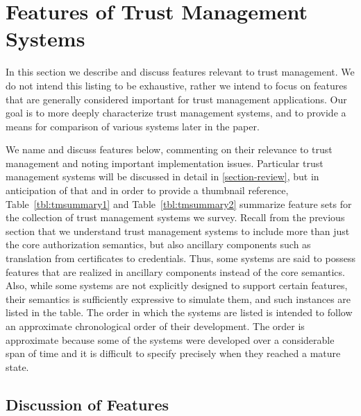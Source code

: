 \section{Features of Trust Management Systems}
\label{section-features}

In this section we describe and discuss features relevant to trust
management.  We do not intend this listing to be exhaustive, rather we
intend to focus on features that are generally considered important
for trust management applications.  Our goal is to more deeply
characterize trust management systems, and to provide a means for
comparison of various systems later in the paper.

We name and discuss features below, commenting on their relevance to trust
management and noting important implementation issues. Particular trust
management systems will be discussed in detail in \autoref{section-review},
but in anticipation of that and in order to provide a thumbnail reference,
Table~\ref{tbl:tmsummary1} and Table~\ref{tbl:tmsummary2} summarize feature
sets for the collection of trust management systems we survey. Recall from
the previous section that we understand trust management systems to
include more than just the core authorization semantics, but also ancillary
components such as translation from certificates to credentials. Thus, some
systems are said to possess features that are realized in ancillary
components instead of the core semantics. Also, while some systems are
not explicitly designed to support certain features, their semantics is
sufficiently expressive to simulate them, and such instances are listed in
the table. The order in which the systems are listed is
intended to follow an approximate chronological order of their development.
The order is approximate because some of the systems were developed over
a considerable span of time and it is difficult to specify precisely
when they reached a mature state.



%


\subsection{Discussion of Features}

